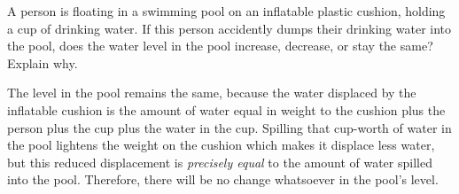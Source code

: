 

A person is floating in a swimming pool on an inflatable plastic cushion, holding a cup of drinking water.  If this person accidently dumps their drinking water into the pool, does the water level in the pool increase, decrease, or stay the same?  Explain why.







The level in the pool remains the same, because the water displaced by the inflatable cushion is the amount of water equal in weight to the cushion plus the person plus the cup plus the water in the cup.  Spilling that cup-worth of water in the pool lightens the weight on the cushion which makes it displace less water, but this reduced displacement is {\it precisely equal} to the amount of water spilled into the pool.  Therefore, there will be no change whatsoever in the pool's level.











